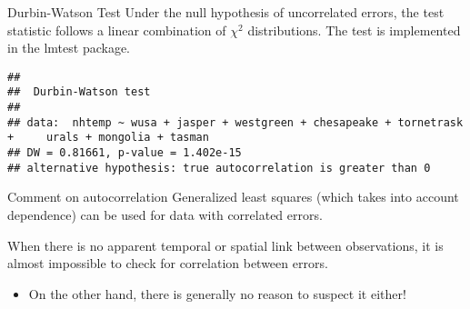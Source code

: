 \begin{frame}[fragile]{Durbin-Watson Test}
\protect\hypertarget{durbin-watson-test}{}
Under the null hypothesis of uncorrelated errors, the test statistic
follows a linear combination of \(\chi^2\) distributions. The test is
implemented in the lmtest package.

\begin{Shaded}
\begin{Highlighting}[]
\OperatorTok{\textasciitilde{}}\StringTok{ }\OperatorTok{+}\StringTok{ }\OperatorTok{+}\StringTok{ }\OperatorTok{+}\StringTok{ }\OperatorTok{+}\StringTok{ }\OperatorTok{+}\StringTok{ }\OperatorTok{+}\StringTok{ }\OperatorTok{+}\StringTok{ }
\end{Highlighting}
\end{Shaded}

\begin{verbatim}
## 
##  Durbin-Watson test
## 
## data:  nhtemp ~ wusa + jasper + westgreen + chesapeake + tornetrask +     urals + mongolia + tasman
## DW = 0.81661, p-value = 1.402e-15
## alternative hypothesis: true autocorrelation is greater than 0
\end{verbatim}
\end{frame}

\begin{frame}{Comment on autocorrelation}
\protect\hypertarget{comment-on-autocorrelation}{}
Generalized least squares (which takes into account dependence) can be
used for data with correlated errors.

When there is no apparent temporal or spatial link between observations,
it is almost impossible to check for correlation between errors.

\begin{itemize}
\tightlist
\item
  On the other hand, there is generally no reason to suspect it either!
\end{itemize}
\end{frame}

